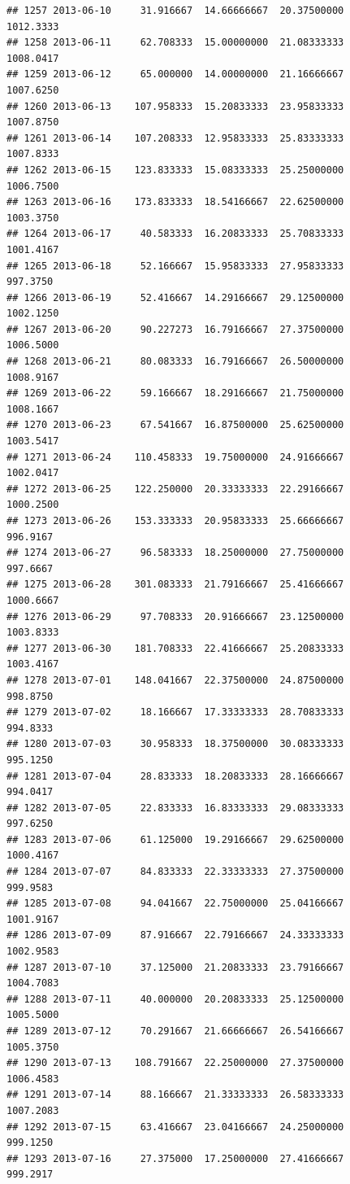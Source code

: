 \documentclass[
]{article}
\begin{document}
\begin{verbatim}
## 1257 2013-06-10     31.916667  14.66666667  20.37500000    1012.3333
## 1258 2013-06-11     62.708333  15.00000000  21.08333333    1008.0417
## 1259 2013-06-12     65.000000  14.00000000  21.16666667    1007.6250
## 1260 2013-06-13    107.958333  15.20833333  23.95833333    1007.8750
## 1261 2013-06-14    107.208333  12.95833333  25.83333333    1007.8333
## 1262 2013-06-15    123.833333  15.08333333  25.25000000    1006.7500
## 1263 2013-06-16    173.833333  18.54166667  22.62500000    1003.3750
## 1264 2013-06-17     40.583333  16.20833333  25.70833333    1001.4167
## 1265 2013-06-18     52.166667  15.95833333  27.95833333     997.3750
## 1266 2013-06-19     52.416667  14.29166667  29.12500000    1002.1250
## 1267 2013-06-20     90.227273  16.79166667  27.37500000    1006.5000
## 1268 2013-06-21     80.083333  16.79166667  26.50000000    1008.9167
## 1269 2013-06-22     59.166667  18.29166667  21.75000000    1008.1667
## 1270 2013-06-23     67.541667  16.87500000  25.62500000    1003.5417
## 1271 2013-06-24    110.458333  19.75000000  24.91666667    1002.0417
## 1272 2013-06-25    122.250000  20.33333333  22.29166667    1000.2500
## 1273 2013-06-26    153.333333  20.95833333  25.66666667     996.9167
## 1274 2013-06-27     96.583333  18.25000000  27.75000000     997.6667
## 1275 2013-06-28    301.083333  21.79166667  25.41666667    1000.6667
## 1276 2013-06-29     97.708333  20.91666667  23.12500000    1003.8333
## 1277 2013-06-30    181.708333  22.41666667  25.20833333    1003.4167
## 1278 2013-07-01    148.041667  22.37500000  24.87500000     998.8750
## 1279 2013-07-02     18.166667  17.33333333  28.70833333     994.8333
## 1280 2013-07-03     30.958333  18.37500000  30.08333333     995.1250
## 1281 2013-07-04     28.833333  18.20833333  28.16666667     994.0417
## 1282 2013-07-05     22.833333  16.83333333  29.08333333     997.6250
## 1283 2013-07-06     61.125000  19.29166667  29.62500000    1000.4167
## 1284 2013-07-07     84.833333  22.33333333  27.37500000     999.9583
## 1285 2013-07-08     94.041667  22.75000000  25.04166667    1001.9167
## 1286 2013-07-09     87.916667  22.79166667  24.33333333    1002.9583
## 1287 2013-07-10     37.125000  21.20833333  23.79166667    1004.7083
## 1288 2013-07-11     40.000000  20.20833333  25.12500000    1005.5000
## 1289 2013-07-12     70.291667  21.66666667  26.54166667    1005.3750
## 1290 2013-07-13    108.791667  22.25000000  27.37500000    1006.4583
## 1291 2013-07-14     88.166667  21.33333333  26.58333333    1007.2083
## 1292 2013-07-15     63.416667  23.04166667  24.25000000     999.1250
## 1293 2013-07-16     27.375000  17.25000000  27.41666667     999.2917

\end{verbatim}
\end{document}
